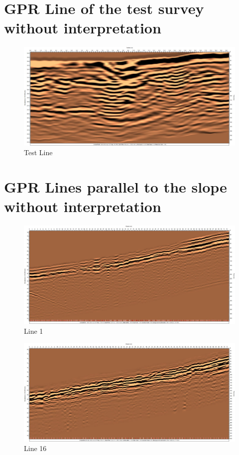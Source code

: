\appendix

\section{GPR Line of the test survey without interpretation}

\begin{figure}[H]
    \centering
    \includegraphics[width=\linewidth]{Images/00_Results/Test_line.jpg}
    \caption{Test Line}
    \label{fig:testLine_}
\end{figure}


\section{GPR Lines parallel to the slope without interpretation}

\begin{figure}[H]
    \centering
    \includegraphics[width=\linewidth]{Images/00_Results/line1.jpg}
    \caption{Line 1}
    \label{fig:line1_}
\end{figure}

\begin{figure}[H]
    \centering
    \includegraphics[width=\linewidth]{Images/00_Results/line16.jpg}
    \caption{Line 16}
    \label{fig:line16_}
\end{figure}

